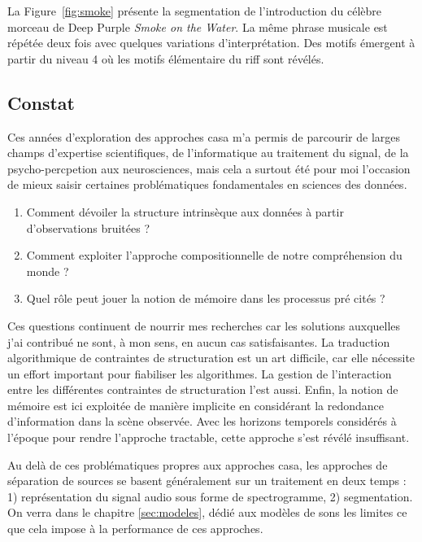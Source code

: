 La Figure~\ref{fig:smoke} présente la segmentation de l'introduction du célèbre morceau de
Deep Purple \emph{Smoke on the Water}. La même phrase musicale est répétée deux fois avec quelques variations d'interprétation. Des motifs émergent à partir du niveau 4 où les motifs élémentaire du riff sont révélés.

\subsection{Constat}

Ces années d'exploration des approches casa m'a permis de parcourir de larges champs d'expertise scientifiques, de l'informatique au traitement du signal, de la psycho-percpetion aux neurosciences, mais cela a surtout été pour moi l'occasion de mieux saisir certaines problématiques fondamentales en sciences des données.
\begin{enumerate}
  \item Comment dévoiler la structure intrinsèque aux données à partir d'observations bruitées ?
  \item Comment exploiter l'approche compositionnelle de notre compréhension du monde ?
  \item Quel rôle peut jouer la notion de mémoire dans les processus pré cités ?
\end{enumerate}
Ces questions continuent de nourrir mes recherches car les solutions auxquelles j'ai contribué ne sont, à mon sens, en aucun cas satisfaisantes. La traduction algorithmique de contraintes de structuration est un art difficile, car elle nécessite un effort important pour fiabiliser les algorithmes. La gestion de l'interaction entre les différentes contraintes de structuration l'est aussi. Enfin, la notion de mémoire est ici exploitée de manière implicite en considérant la redondance d'information dans la scène observée. Avec les horizons temporels considérés à l'époque pour rendre l'approche tractable, cette approche s'est révélé insuffisant.  %

Au delà de ces problématiques propres aux approches casa, les approches de séparation de sources se basent généralement sur un traitement en deux temps : 1) représentation du signal audio sous forme de spectrogramme, 2) segmentation. On verra dans le chapitre \ref{sec:modeles}, dédié aux modèles de sons les limites ce que cela impose à la performance de ces approches.

